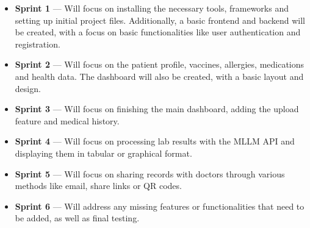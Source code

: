 \begin{itemize}
    \item \textbf{Sprint 1} --- Will focus on installing the necessary tools, frameworks and setting up initial project files. Additionally, a basic frontend and backend will be created, with a focus on basic functionalities like user authentication and registration.
    \item \textbf{Sprint 2} --- Will focus on the patient profile, vaccines, allergies, medications and health data. The dashboard will also be created, with a basic layout and design.
    \item \textbf{Sprint 3} --- Will focus on finishing the main dashboard, adding the upload feature and medical history.
    \item \textbf{Sprint 4} --- Will focus on processing lab results with the MLLM API and displaying them in tabular or graphical format.
    \item \textbf{Sprint 5} --- Will focus on sharing records with doctors through various methods like email, share links or QR codes.
    \item \textbf{Sprint 6} --- Will address any missing features or functionalities that need to be added, as well as final testing.
\end{itemize}
